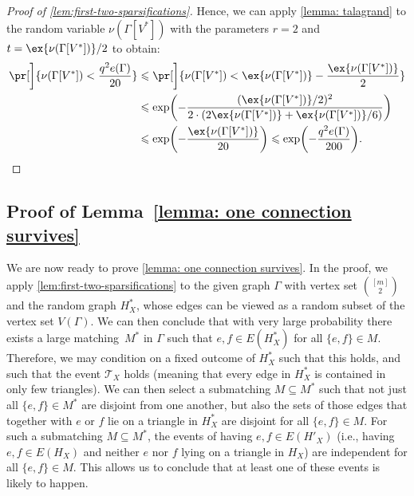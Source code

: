 \documentclass[11pt,reqno,oneside]{amsart}
\theoremstyle{definition}
\newcommand\1{\mathbf{1}}
\DeclarePairedDelimiter{\paren}{\lparen}{\rparen}
\newcommand{\su}{\subseteq}
\let\leq\leqslant
\let\le\leqslant
\begin{document}
\begin{proof}[Proof of \cref{lem:first-two-sparsifications}]
     Hence, we can apply \cref{lemma: talagrand} to the random variable $\nu(\Gamma[V^*])$ with the parameters $r=2$ and $t=\ex{\nu(\Gamma[V^*])}/2$ to obtain:
         \begin{align*}
    \pr[\bigg]{\nu(\Gamma[V^*])< \frac{q^2e\paren{\Gamma}}{20}}&\leq \pr[\bigg]{\nu(\Gamma[V^*])< \ex{\nu(\Gamma[V^*])}-\frac{\ex{\nu(\Gamma[V^*])}}{2}}\notag\\
    &\leq \exp\paren[\bigg]{-\frac{(\ex{\nu(\Gamma[V^*])}/2)^2}{2\cdot \left(2\ex{\nu(\Gamma[V^*])}+\ex{\nu(\Gamma[V^*])}/6\right)}}\notag\\
    &\le\exp\paren[\bigg]{-\frac{\ex{\nu(\Gamma[V^*])}}{20}}\leq \exp\paren[\bigg]{-\frac{q^2e\paren{\Gamma}}{200}}.
    \qedhere
    \end{align*} 
\end{proof}




\subsection{Proof of Lemma~\ref{lemma: one connection survives}} We are now ready to prove \cref{lemma: one connection survives}. In the proof, we apply \cref{lem:first-two-sparsifications} to the given graph $\Gamma$ with vertex set $\binom{[m]}2$ and the random graph $H_X^*$, whose edges can be viewed as a random subset of the vertex set $V(\Gamma)$. We can then conclude that with very large probability there exists a large matching~$M^*$ in $\Gamma$ such that $e,f\in E(H^*_X)$ for all $\{e,f\}\in M$. Therefore, we may condition on a fixed outcome of $H^*_X$ such that this holds, and such that the event $\mathcal{T}_X$ holds (meaning that every edge in $H^*_X$ is contained in only few triangles). We can then select a submatching $M\su M^*$ such that not just all $\{e,f\}\in M^*$ are disjoint from one another, but also the sets of those edges that together with $e$ or $f$ lie on a triangle in $H^*_X$ are disjoint for all $\{e,f\}\in M$. For such a submatching $M\su M^*$, the events of having $e,f\in E(H'_X)$ (i.e., having $e,f\in E(H_X)$ and neither $e$ nor $f$ lying on a triangle in $H_X$) are independent for all $\{e,f\}\in M$. This allows us to conclude that at least one of these events is likely to happen.
\end{document}
